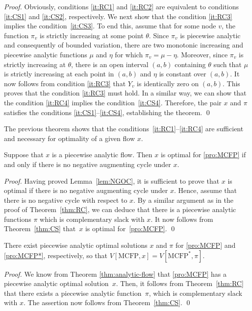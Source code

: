 \documentclass{svjour3}                     \smartqed
\begin{document}
\begin{proof}
Obviously, conditions \ref{it:RC1} and \ref{it:RC2} are equivalent to conditions \ref{it:CS1} and \ref{it:CS2}, respectively. We next show that the condition \ref{it:RC3} implies the condition~\ref{it:CS3}. To end this, assume that for some node $v$, the function $\pi_v$ is strictly increasing at some point $\theta$. Since $\pi_v$ is piecewise analytic and consequently of bounded variation, there are two monotonic increasing and piecewise analytic functions $\mu$ and $\eta$ for which $\pi_v=\mu-\eta$. Moreover, since $\pi_v$ is strictly increasing at $\theta$, there is an open interval $(a,b)$ containing $\theta$ such that $\mu$ is strictly increasing at each point in $(a,b)$ and $\eta$ is constant over $(a,b)$. It now follows from condition \ref{it:RC3} that $Y_v$ is identically zero on $(a,b)$. This proves that the condition \ref{it:RC3} must hold. In a similar way, we can show that the condition \ref{it:RC4} implies the condition~\ref{it:CS4}. Therefore, the pair $x$ and $\pi$ satisfies the conditions \ref{it:CS1}--\ref{it:CS4}, establishing the theorem.
\qed\end{proof}

The previous theorem shows that the conditions~\ref{it:RC1}--\ref{it:RC4} are sufficient and necessary for optimality of a given flow $x$.



\begin{theorem}
\label{thm:NCOC}
Suppose that $x$ is a piecewise analytic flow. Then $x$ is optimal for \eqref{pro:MCFP} if and only if there is no negative augmenting cycle under $x$.
\end{theorem}
\begin{proof}
Having proved Lemma~\ref{lem:NGOC}, it is sufficient to prove that $x$ is optimal if there is no negative augmenting cycle under $x$. Hence, assume that there is no negative cycle with respect to $x$. By a similar argument as in the proof of Theorem~\ref{thm:RC}, we can deduce that there is a piecewise analytic functions $\pi$ which is complementary slack with $x$. It now follows from Theorem~\ref{thm:CS} that~$x$ is optimal for~\eqref{pro:MCFP}.
\qed
\end{proof}

\begin{theorem}
\label{StrongDuality1}
There exist piecewise analytic optimal solutions $x$ and $\pi$ for \eqref{pro:MCFP} and \eqref{pro:MCFP*}, respectively, so that $V[\text{MCFP},x]=V[\text{MCFP}^*,\pi]$.
\end{theorem}
\begin{proof}
We know from Theorem \ref{thm:analytic-flow} that \eqref{pro:MCFP} has a piecewise analytic optimal solution~$x$. Then, it follows from Theorem~\ref{thm:RC} that there exists a piecewise analytic function~$\pi$, which is complementary slack with $x$. The assertion now follows from Theorem~\ref{thm:CS}.
\qed
\end{proof}
\end{document}
